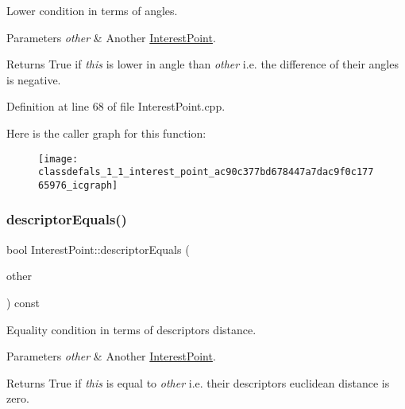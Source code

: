 Lower condition in terms of angles.


\begin{DoxyParams}{Parameters}
{\em other} & Another \hyperlink{classdefals_1_1_interest_point}{Interest\+Point}.\\
\hline
\end{DoxyParams}
\begin{DoxyReturn}{Returns}
True if {\itshape this} is lower in angle than {\itshape other} i.\+e. the difference of their angles is negative. 
\end{DoxyReturn}


Definition at line 68 of file Interest\+Point.\+cpp.

Here is the caller graph for this function\+:\nopagebreak
\begin{figure}[H]
\begin{center}
\leavevmode
\texttt{[image: classdefals\_1\_1\_interest\_point\_ac90c377bd678447a7dac9f0c17765976\_icgraph]}
\end{center}
\end{figure}
\mbox{\label{classdefals_1_1_interest_point_ad479527a3ec0d7f765f949d6b41c10a6}} 
\subsubsection{\texorpdfstring{descriptor\+Equals()}{descriptorEquals()}}
{\footnotesize\ttfamily bool Interest\+Point\+::descriptor\+Equals (\begin{DoxyParamCaption}\item[{const \hyperlink{classdefals_1_1_interest_point}{Interest\+Point} \&}]{other }\end{DoxyParamCaption}) const}

Equality condition in terms of descriptors\textquotesingle{} distance.


\begin{DoxyParams}{Parameters}
{\em other} & Another \hyperlink{classdefals_1_1_interest_point}{Interest\+Point}.\\
\hline
\end{DoxyParams}
\begin{DoxyReturn}{Returns}
True if {\itshape this} is equal to {\itshape other} i.\+e. their descriptors\textquotesingle{} euclidean distance is zero. 
\end{DoxyReturn}


